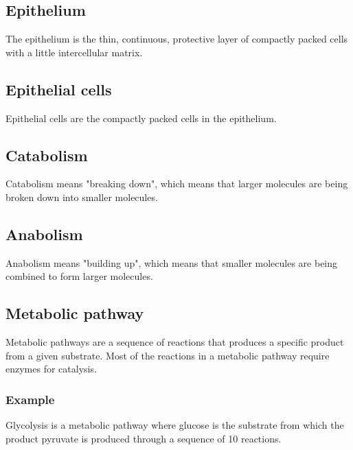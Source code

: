 \documentclass[11pt]{article}
\begin{document}
\subsection{Epithelium}
\label{sec:orgf539866}
The epithelium is the thin, continuous, protective layer of compactly packed cells with a little intercellular matrix.
\subsection{Epithelial cells}
\label{sec:org455f03f}
Epithelial cells are the compactly packed cells in the epithelium.
\subsection{Catabolism}
\label{sec:orgac78c31}
Catabolism means "breaking down", which means that larger molecules are being broken down into smaller molecules.
\subsection{Anabolism}
\label{sec:org12cde22}
Anabolism means "building up", which means that smaller molecules are being combined to form larger molecules.

\newpage
\subsection{Metabolic pathway}
\label{sec:org2e3cb1d}
Metabolic pathways are a sequence of reactions that produces a specific product from a given substrate. Most of the reactions in a metabolic pathway require enzymes for catalysis.
\subsubsection{Example}
\label{sec:org9a5270a}
Glycolysis is a metabolic pathway where glucose is the substrate from which the product pyruvate is produced through a sequence of 10 reactions.
\end{document}

